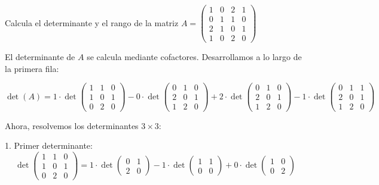 \documentclass[addpoints,spanish, 12pt,a4paper]{exam}
\begin{document}
\begin{questions}
\question[1] Calcula el determinante y el rango de  la matriz $A=\begin{pmatrix}
1 & 0 & 2 & 1 \\
0 & 1 & 1 & 0 \\
2 & 1 & 0 & 1 \\
1 & 0 & 2 & 0
\end{pmatrix}$
    \begin{solution}

            El determinante de \(A\) se calcula mediante cofactores. Desarrollamos a lo largo de la primera fila:
        
        \[
        \det(A) = 1 \cdot \det \begin{pmatrix}
        1 & 1 & 0 \\
        1 & 0 & 1 \\
        0 & 2 & 0
        \end{pmatrix}
        - 0 \cdot \det \begin{pmatrix}
        0 & 1 & 0 \\
        2 & 0 & 1 \\
        1 & 2 & 0
        \end{pmatrix}
        + 2 \cdot \det \begin{pmatrix}
        0 & 1 & 0 \\
        2 & 0 & 1 \\
        1 & 2 & 0
        \end{pmatrix}
        - 1 \cdot \det \begin{pmatrix}
        0 & 1 & 1 \\
        2 & 0 & 1 \\
        1 & 2 & 0
        \end{pmatrix}
        \]
        
        Ahora, resolvemos los determinantes \(3 \times 3\):
        
        1. Primer determinante:
        \[
        \det \begin{pmatrix}
        1 & 1 & 0 \\
        1 & 0 & 1 \\
        0 & 2 & 0
        \end{pmatrix}
        = 1 \cdot \det \begin{pmatrix} 0 & 1 \\ 2 & 0 \end{pmatrix}
        - 1 \cdot \det \begin{pmatrix} 1 & 1 \\ 0 & 0 \end{pmatrix} 
        + 0 \cdot \det \begin{pmatrix} 1 & 0 \\ 0 & 2 \end{pmatrix}
        \]
        

\end{solution}
\end{questions}
\end{document}

